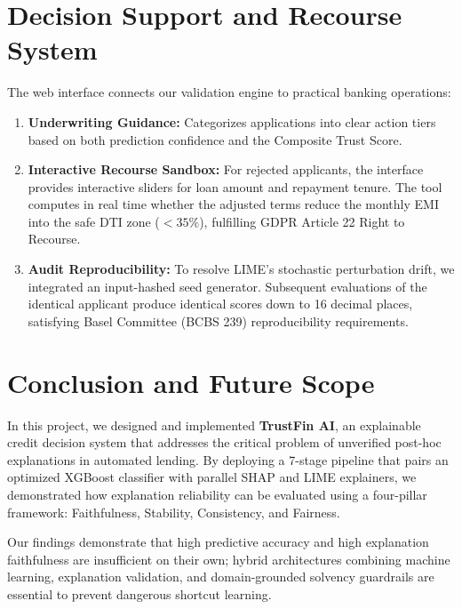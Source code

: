 \documentclass[conference]{IEEEtran}
\begin{document}
\section{Decision Support and Recourse System}
The web interface connects our validation engine to practical banking operations:
\begin{enumerate}
    \item \textbf{Underwriting Guidance:} Categorizes applications into clear action tiers based on both prediction confidence and the Composite Trust Score.
    \item \textbf{Interactive Recourse Sandbox:} For rejected applicants, the interface provides interactive sliders for loan amount and repayment tenure. The tool computes in real time whether the adjusted terms reduce the monthly EMI into the safe DTI zone ($< 35\%$), fulfilling GDPR Article 22 Right to Recourse.
    \item \textbf{Audit Reproducibility:} To resolve LIME's stochastic perturbation drift, we integrated an input-hashed seed generator. Subsequent evaluations of the identical applicant produce identical scores down to 16 decimal places, satisfying Basel Committee (BCBS 239) reproducibility requirements.
\end{enumerate}

\section{Conclusion and Future Scope}
In this project, we designed and implemented \textbf{TrustFin AI}, an explainable credit decision system that addresses the critical problem of unverified post-hoc explanations in automated lending. By deploying a 7-stage pipeline that pairs an optimized XGBoost classifier with parallel SHAP and LIME explainers, we demonstrated how explanation reliability can be evaluated using a four-pillar framework: Faithfulness, Stability, Consistency, and Fairness.

Our findings demonstrate that high predictive accuracy and high explanation faithfulness are insufficient on their own; hybrid architectures combining machine learning, explanation validation, and domain-grounded solvency guardrails are essential to prevent dangerous shortcut learning.
\end{document}
